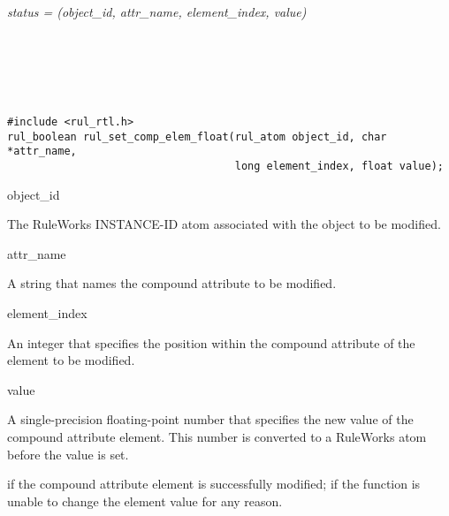 \Syntax

\it{status} = (\it{object\_id},
\it{attr\_name}, \it{element\_index}, \it{value})

\begin{args}
   \\
   \\
   \\
   \\
\end{args}

\CBinding
\begin{verbatim}
#include <rul_rtl.h>
rul_boolean rul_set_comp_elem_float(rul_atom object_id, char *attr_name,
                                    long element_index, float value);
\end{verbatim}

\begin{arguments}
\item[object\_id]

  The RuleWorks INSTANCE-ID atom associated with the object to be
  modified.

\item[attr\_name]

  A string that names the compound attribute to be modified.

\item[element\_index]

  An integer that specifies the position within the compound attribute
  of the element to be modified.

\item[value]

  A single-precision floating-point number that specifies the new
  value of the compound attribute element.  This number is converted
  to a RuleWorks  atom before the value is set.
\end{arguments}

\ReturnValue

 if the compound attribute element is successfully modified;
 if the function is unable to change the element value for
any reason.

\begin{seealso}





\end{seealso}

